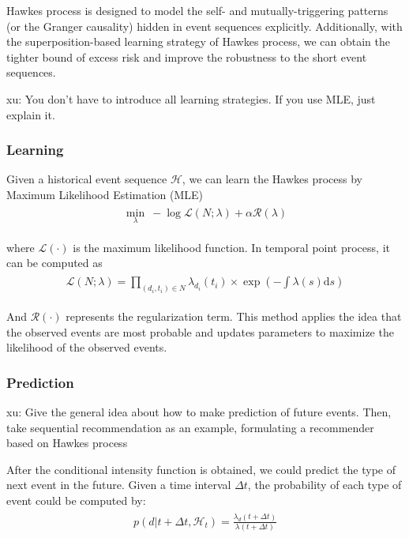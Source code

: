 \documentclass[runningheads]{llncs}
\newcommand{\dd}{\mathrm{d}}
\newcommand{\xu}[1]{{\color{red} xu: #1}}
\begin{document}
Hawkes process is designed to model the self- and mutually-triggering patterns (or the Granger causality) hidden in event sequences explicitly. Additionally, with the superposition-based learning strategy of Hawkes process, we can obtain the tighter bound of excess risk \cite{xu2018benefits} and improve the robustness to the short event sequences.

\xu{You don't have to introduce all learning strategies. If you use MLE, just explain it.}
\subsubsection{Learning} Given a historical event sequence $\mathcal{H}$, we can learn the Hawkes process by Maximum Likelihood Estimation (MLE)
\begin{eqnarray}
\begin{aligned}
\min_{\lambda} \ -\log \mathcal{L}(N;\lambda) + \alpha \mathcal{R}(\lambda) 
\end{aligned}    
\end{eqnarray}

where $\mathcal{L}(\cdot)$ is the  maximum likelihood function. In temporal point process, it can be computed as
\begin{eqnarray}
\begin{aligned}
\mathcal{L}(N;\lambda) = \prod_{(d_i, t_i) \in N} \lambda_{d_i}(t_i) \times \exp \left( - \int \lambda(s) \dd s \right)
\end{aligned}    
\end{eqnarray}

And $\mathcal{R}(\cdot)$ represents the regularization term. This method applies the idea that the observed events are most probable and updates parameters to maximize the likelihood of the observed events. 

\subsubsection{Prediction} 
\xu{Give the general idea about how to make prediction of future events. Then, take sequential recommendation as an example, formulating a recommender based on Hawkes process}

After the conditional intensity function is obtained, we could predict the type of next event in the future. Given a time interval $\Delta t$, the probability of each type of event could be computed by:
\begin{eqnarray}
\begin{aligned}
p(d | t+\Delta t, \mathcal{H}_t) = \frac{\lambda_d(t+\Delta t)}{\lambda (t+\Delta t)}\label{eqn5}
\end{aligned}    
\end{eqnarray}
\end{document}
